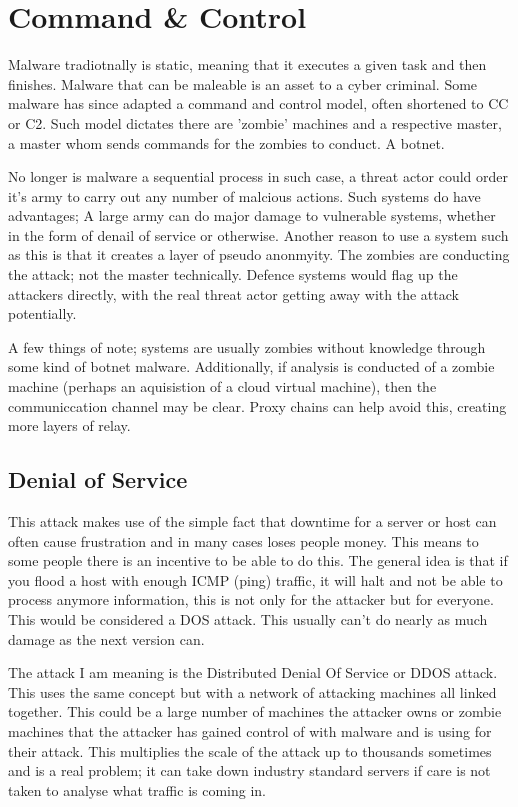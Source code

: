 \section{Command \& Control}
Malware tradiotnally is static, meaning that it executes a given task and then finishes. Malware that can be maleable is an asset to a cyber criminal. 
Some malware has since adapted a command and control model, often shortened to CC or C2. Such model dictates there are 'zombie' machines and a respective master, a master whom sends commands for the zombies to conduct. A botnet.

No longer is malware a sequential process in such case, a threat actor could order it's army to carry out any number of malcious actions. Such systems do have advantages; A large army can do major damage to vulnerable systems, whether in the form of denail of service or otherwise.
Another reason to use a system such as this is that it creates a layer of pseudo anonmyity. The zombies are conducting the attack; not the master technically. Defence systems would flag up the attackers directly, with the real threat actor getting away with the attack potentially.

A few things of note; systems are usually zombies without knowledge through some kind of botnet malware. Additionally, if analysis is conducted of a zombie machine (perhaps an aquisistion of a cloud virtual machine), then the communiccation channel may be clear. Proxy chains can help avoid this, creating more layers of relay.


\subsection{Denial of Service}
This attack makes use of the simple fact that downtime for a server or host can often cause frustration and in many cases loses people money. This means to some people there is an incentive to be able to do this. The general idea is that if you flood a host with enough ICMP (ping) traffic, it will halt and not be able to process anymore information, this is not only for the attacker but for everyone. This would be considered a DOS attack. 
This usually can't do nearly as much damage as the next version can. 

The attack I am meaning is the Distributed Denial Of Service or DDOS attack. This uses the same concept but with a network of attacking machines all linked together. This could be a large number of machines the attacker owns or zombie machines that the attacker has gained control of with malware and is using for their attack. This multiplies the scale of the attack up to thousands sometimes and is a real problem; it can take down industry 
standard servers if care is not taken to analyse what traffic is coming in.

